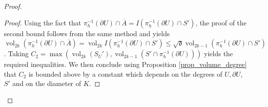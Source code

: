 \documentclass[12pt]{amsbook}%
\theoremstyle{definition}
\theoremstyle{remark}
\numberwithin{section}{chapter}
\numberwithin{subsection}{section}
\numberwithin{figure}{chapter}
\DeclareMathOperator{\C}{\mathbb{C}}
\DeclareMathOperator{\vol}{vol}
\def\fd{{\mathfrak{d}}}
\def\fS{{\mathfrak{S}}}
\begin{document}
{{\begin{proof}
\begin{proof}
Using the fact that $\pi_h^{-1}(\partial U) \cap \overline{A} = I(\pi_h^{-1}(\partial U) \cap S')$, the proof of the second bound follows from the same method and yields $\vol_{2k}(\pi_h^{-1}(\partial U) \cap \overline{A}) = \vol_{2k } I(\pi_h^{-1}(\partial U) \cap S') \leqslant  \sqrt{\fd} \vol_{2k-1}(\pi_h^{-1}(\partial U) \cap S')  $. 
Taking $C_2 = \max ( \vol_{2k}(S_U'), \vol_{2k-1}(S'\cap \pi_h^{-1}(\partial U)))$ yields the required inequalities. 
 We then conclude using Proposition \ref{prop_volume_degree} that $C_2$ is bounded above by a constant which depends on the degrees of $U, \partial U$, $S'$ and on the diameter of $K$.
%
%

\end{proof}
\end{proof}}}
\end{document}
